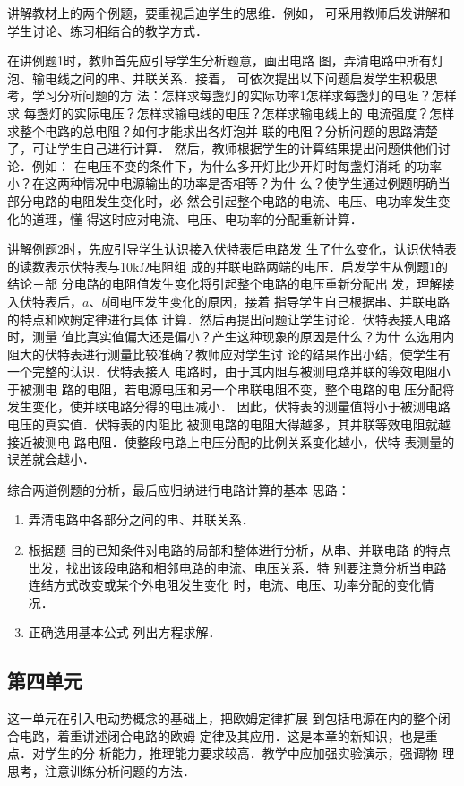 讲解教材上的两个例题，要重视启迪学生的思维．例如，
可采用教师启发讲解和学生讨论、练习相结合的教学方式．

在讲例题1时，教师首先应引导学生分析题意，画出电路
图，弄清电路中所有灯泡、输电线之间的串、并联关系．接着，
可依次提出以下问题启发学生积极思考，学习分析问题的方
法：怎样求每盏灯的实际功率1怎样求每盏灯的电阻？怎样求
每盏灯的实际电压？怎样求输电线的电压？怎样求输电线上的
电流强度？怎样求整个电路的总电阻？如何才能求出各灯泡并
联的电阻？分析问题的思路清楚了，可让学生自己进行计算．
然后，教师根据学生的计算结果提出问题供他们讨论．例如：
在电压不变的条件下，为什么多开灯比少开灯时每盏灯消耗
的功率小？在这两种情况中电源输出的功率是否相等？为什
么？使学生通过例题明确当部分电路的电阻发生变化时，必
然会引起整个电路的电流、电压、电功率发生变化的道理，懂
得这时应对电流、电压、电功率的分配重新计算．

讲解例题2时，先应引导学生认识接入伏特表后电路发
生了什么变化，认识伏特表的读数表示伏特表与10k$\Omega$电阻组
成的并联电路两端的电压．启发学生从例题1的结论－部
分电路的电阻值发生变化将引起整个电路的电压重新分配出
发，理解接入伏特表后，$a$、$b$间电压发生变化的原因，接着
指导学生自己根据串、并联电路的特点和欧姆定律进行具体
计算．然后再提出问题让学生讨论．伏特表接入电路时，测量
值比真实值偏大还是偏小？产生这种现象的原因是什么？为什
么选用内阻大的伏特表进行测量比较准确？教师应对学生讨
论的结果作出小结，使学生有一个完整的认识．伏特表接入
电路时，由于其内阻与被测电路并联的等效电阻小于被测电
路的电阻，若电源电压和另一个串联电阻不变，整个电路的电
压分配将发生变化，使并联电路分得的电压减小．
因此，伏特表的测量值将小于被测电路电压的真实值．伏特表的内阻比
被测电路的电阻大得越多，其并联等效电阻就越接近被测电
路电阻．使整段电路上电压分配的比例关系变化越小，伏特
表测量的误差就会越小．

综合两道例题的分析，最后应归纳进行电路计算的基本
思路：
\begin{enumerate}
\item 弄清电路中各部分之间的串、并联关系．
\item 根据题
目的已知条件对电路的局部和整体进行分析，从串、并联电路
的特点出发，找出该段电路和相邻电路的电流、电压关系．特
别要注意分析当电路连结方式改变或某个外电阻发生变化
时，电流、电压、功率分配的变化情况．
\item 正确选用基本公式
列出方程求解．
\end{enumerate}

\subsection{第四单元}
这一单元在引入电动势概念的基础上，把欧姆定律扩展
到包括电源在内的整个闭合电路，着重讲述闭合电路的欧姆
定律及其应用．这是本章的新知识，也是重点．对学生的分
析能力，推理能力要求较高．教学中应加强实验演示，强调物
理思考，注意训练分析问题的方法．


